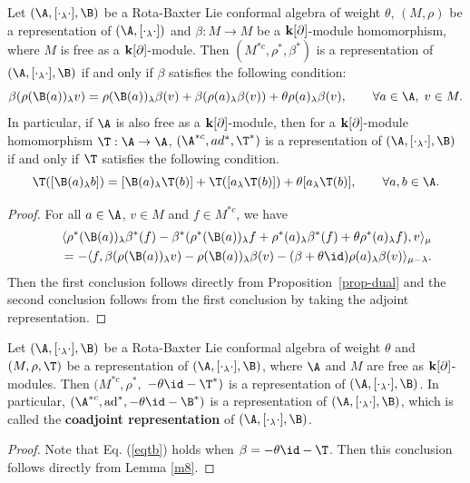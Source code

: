 \documentclass[12pt]{amsart}
\begin{document}
\begin{lemma} \label{m8}
Let  $(\A,[\cdot_\lambda \cdot],\B)$ be a
Rota-Baxter Lie conformal algebra of weight  $\theta$, $(M,\rho) $ be a representation
of $(\A,[\cdot_\lambda \cdot])$ and $\beta:M\rightarrow M$ be a ${\bf
k}[\partial]$-module homomorphism, where $M$ is free as a ${\bf
k}[\partial]$-module. Then $(M^{*c},\rho^*,\beta^*)$
is a representation of $(\A,[\cdot_\lambda \cdot],\B)$ if and only
if $\beta$ satisfies the following condition:
\begin{equation}\label{eqtb}
    \beta(\rho(\B( a))_\lambda v)=\rho(\B (a))_\lambda \beta( v)+\beta(\rho (a)_\lambda \beta (v)) +\theta\rho(a)_\lambda \beta (v),\qquad \forall a\in \A,\;v\in M.
\end{equation}
In particular,  if $\A$ is also free as a ${\bf k}[\partial]$-module, then for a ${\bf k}[\partial]$-module homomorphism $\T:\A\rightarrow \A$, $(\A^{*c},ad^*,\T^*)$ is a representation of $(\A,[\cdot_\lambda \cdot],\B)$ if and only if $\T$ satisfies the following condition.
\begin{equation}\label{eqaa}
    \T([\B( a)_\lambda b])=[\B (a)_\lambda \T( b)]+\T([a_\lambda \T (b)] )+\theta[a_\lambda \T (b)],\qquad \forall a,b\in \A.
\end{equation}


\end{lemma}
\begin{proof}
For all $a\in \A$, $v\in M$ and $f\in M^{\ast c}$, we have
\begin{align*}
    & &\langle  \rho^*(\B (a))_\lambda \beta^* (f)-\beta^*( \rho^*(\B (a))_\lambda f+\rho^*(a)_\lambda \beta^* (f)+\theta\rho^*(a)_\lambda f) ,v \rangle_\mu\\
    &&\quad=-\langle f,\beta(\rho(\B (a))_\lambda v)-\rho(\B (a))_\lambda \beta (v)-(\beta+\theta\id)\rho(a)_\lambda\beta (v)\rangle_{\mu-\lambda}.
\end{align*}
Then the first conclusion follows directly from
Proposition~\ref{prop-dual} and the second conclusion follows from the
first conclusion by taking the adjoint representation.
\end{proof}


\begin{proposition}\label{pp-rbdr}
Let $(\A,[\cdot_\lambda \cdot],\B)$ be a
Rota-Baxter Lie conformal algebra of weight  $\theta$ and $(M,\rho,\T ) $ be a
representation of $(\A,[\cdot_\lambda \cdot],\B)$, where $\A$ and $M$ are
free as   ${\bf k}[\partial]$-modules. Then $(M^{*c},\rho^*,$
$-\theta\id-\T^*)$  
is a representation of $(\A,[\cdot_\lambda \cdot],\B)$. In
particular,  $(\A^{*c},{\rm ad}^*,-\theta \id-\B^*) $ is a
representation of $(\A,[\cdot_\lambda \cdot],\B)$, which is called
the {\bf coadjoint representation} of $(\A,[\cdot_\lambda
\cdot],\B)$.
\end{proposition}
\begin{proof}
Note that Eq. (\ref{eqtb}) holds when $\beta=-\theta\id-\T$. Then this conclusion follows directly from Lemma \ref{m8}.
\end{proof}
\end{document}
